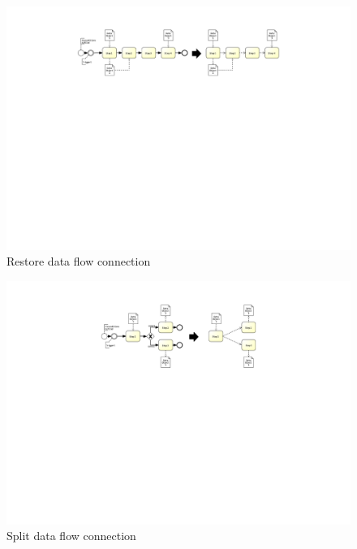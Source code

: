 \begin{figure}[h!]
	\centering
	\includegraphics[width=\textwidth, trim={7.5cm 15cm 7cm 2cm}]{img/ExtractDFDRestore.pdf}
	\caption{Restore data flow connection}
	\label{fig:restoreDataFlow}
\end{figure}

\begin{figure}[h!]
	\includegraphics[width=14cm, trim={8.5cm 13.8cm 8.5cm 2.2cm}]{img/ExtractDFDGateWaySplit.pdf}
	\caption{Split data flow connection}
	\label{fig:splitDataFlow}
\end{figure}

